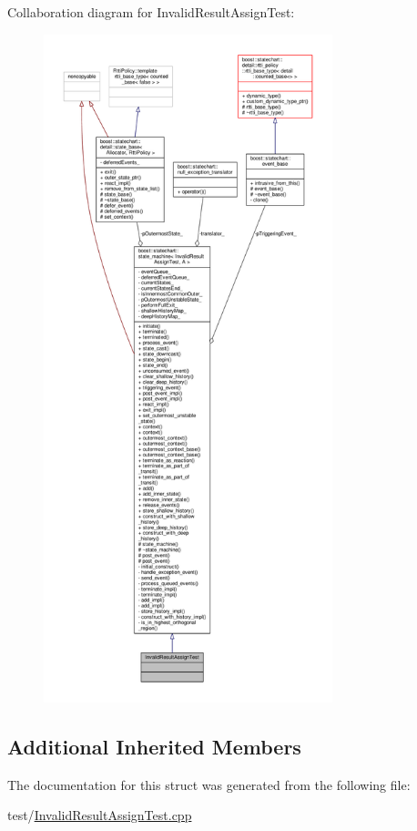 Collaboration diagram for Invalid\+Result\+Assign\+Test\+:
\nopagebreak
\begin{figure}[H]
\begin{center}
\leavevmode
\includegraphics[height=550pt]{struct_invalid_result_assign_test__coll__graph}
\end{center}
\end{figure}
\subsection*{Additional Inherited Members}


The documentation for this struct was generated from the following file\+:\begin{DoxyCompactItemize}
\item 
test/\mbox{\hyperlink{_invalid_result_assign_test_8cpp}{Invalid\+Result\+Assign\+Test.\+cpp}}\end{DoxyCompactItemize}
